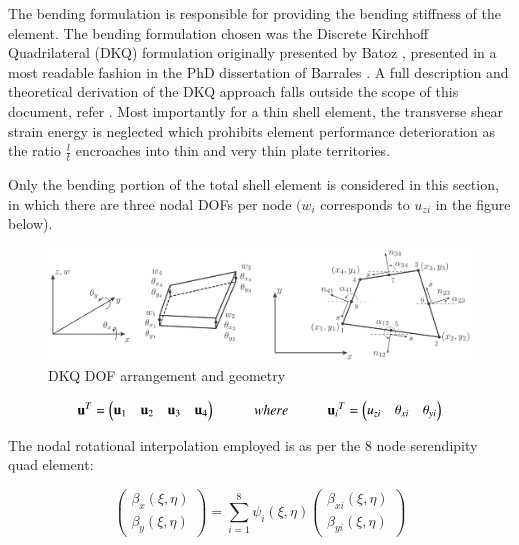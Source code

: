 The bending formulation is responsible for providing the bending stiffness of the element. The bending formulation chosen was the Discrete Kirchhoff Quadrilateral (DKQ) formulation  originally presented by Batoz \cite{Bat82}, presented in a most readable fashion in the PhD dissertation of Barrales \cite{Bar12}. A full description and theoretical derivation of the DKQ approach falls outside the scope of this document, refer \cite{Bat82}. Most importantly for a thin shell element, the transverse shear strain energy is neglected which prohibits element performance deterioration as the ratio $\frac{l}{t}$ encroaches into thin and very thin plate territories.

Only the bending portion of the total shell element is considered in this section, in which there are three nodal DOFs per node $(w_i$ corresponds to $u_{zi}$ in the figure below).

\begin{figure}[H]
	\centering
	\def\svgwidth{\columnwidth}
	\includegraphics[width=15cm]{images/8nodeseren.png}
	\caption{DKQ DOF arrangement and geometry \cite{Bar12}}
	\label{8nodeseren}
\end{figure}

\begin{equation} 
\mathbf{u}^T = 
\begin{pmatrix}
\mathbf{u}_1 & \mathbf{u}_2 & \mathbf{u}_3 & \mathbf{u}_4
\end{pmatrix} 
\hspace{10mm}
where
\hspace{10mm}
\mathbf{u}{_i}^T = 
\begin{pmatrix}
{u_{zi}} & {\theta_{xi}} & {\theta_{yi}}
\end{pmatrix}
\label{equationBending}
\end{equation}

The nodal rotational interpolation employed is as per the 8 node serendipity quad element:

\begin{equation} 
\begin{pmatrix}
\beta_x (\xi , \eta) \\
\beta_y (\xi , \eta)
\end{pmatrix}
= \sum_{i=1}^8 \psi_i (\xi , \eta) 
\begin{pmatrix}
\beta_{xi} (\xi , \eta) \\
\beta_{yi} (\xi , \eta)
\end{pmatrix}
\label{equation20}
\end{equation}

